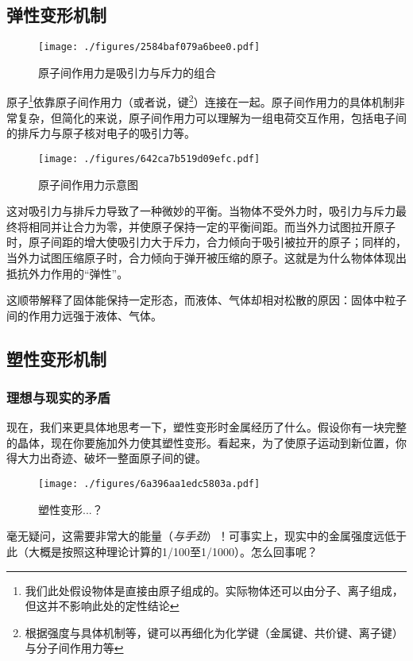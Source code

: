 \subsection{弹性变形机制}
\begin{figure}[ht]
\centering
\texttt{[image: ./figures/2584baf079a6bee0.pdf]}
\caption{原子间作用力是吸引力与斥力的组合} \label{fig_MetDfm_5}
\end{figure}
原子\footnote{我们此处假设物体是直接由原子组成的。实际物体还可以由分子、离子组成，但这并不影响此处的定性结论}依靠原子间作用力（或者说，键\footnote{根据强度与具体机制等，键可以再细化为化学键（金属键、共价键、离子键）与分子间作用力等}）连接在一起。原子间作用力的具体机制非常复杂，但简化的来说，原子间作用力可以理解为一组电荷交互作用，包括电子间的排斥力与原子核对电子的吸引力等。

\begin{figure}[ht]
\centering
\texttt{[image: ./figures/642ca7b519d09efc.pdf]}
\caption{原子间作用力示意图} \label{fig_MetDfm_4}
\end{figure}

这对吸引力与排斥力导致了一种微妙的平衡。当物体不受外力时，吸引力与斥力最终将相同并让合力为零，并使原子保持一定的平衡间距。而当外力试图拉开原子时，原子间距的增大使吸引力大于斥力，合力倾向于吸引被拉开的原子；同样的，当外力试图压缩原子时，合力倾向于弹开被压缩的原子。这就是为什么物体体现出抵抗外力作用的“弹性”。

这顺带解释了固体能保持一定形态，而液体、气体却相对松散的原因：固体中粒子间的作用力远强于液体、气体。

\subsection{塑性变形机制}

\subsubsection{理想与现实的矛盾}
现在，我们来更具体地思考一下，塑性变形时金属经历了什么。假设你有一块完整的晶体，现在你要施加外力使其塑性变形。看起来，为了使原子运动到新位置，你得大力出奇迹、破坏一整面原子间的键。
\begin{figure}[ht]
\centering
\texttt{[image: ./figures/6a396aa1edc5803a.pdf]}
\caption{塑性变形...？} \label{fig_MetDfm_13}
\end{figure}
毫无疑问，这需要非常大的能量（\textsl{与手劲}）！可事实上，现实中的金属强度远低于此（大概是按照这种理论计算的1/100至1/1000）。怎么回事呢？

